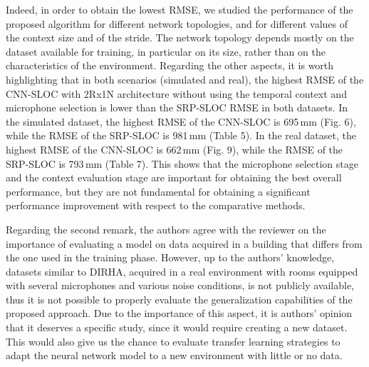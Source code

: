 \documentclass[11pt, technote, letterpaper, oneside, onecolumn]{IEEEtran}
\begin{document}
\begin{enumerate}
 Indeed, in order to obtain the lowest RMSE, we studied the performance of the proposed algorithm for different network topologies, and for different values of the context size and of the stride. The network topology depends mostly on the dataset available for training, in particular on its size, rather than on the characteristics of the environment. Regarding the other aspects, it is worth highlighting that in both scenarios (simulated and real), the highest RMSE of the CNN-SLOC with 2Rx1N architecture without using the temporal context and microphone selection is lower than the SRP-SLOC RMSE in both datasets. In the simulated dataset, the highest RMSE of the CNN-SLOC is 695\,mm (Fig. 6), while the RMSE of the SRP-SLOC is 981\,mm (Table 5). In the real dataset, the highest RMSE of the CNN-SLOC is 662\,mm (Fig. 9), while the RMSE of the SRP-SLOC is 793\,mm (Table 7). This shows that the microphone selection stage and the context evaluation stage are important for obtaining the best overall performance, but they are not fundamental for obtaining a significant performance improvement with respect to the comparative methods.
 
 


Regarding the second remark, the authors agree with the reviewer on the importance of evaluating a model on data acquired in a building that differs from the one used in the training phase. However, up to the authors' knowledge, datasets similar to DIRHA, acquired in a real environment with rooms equipped with several microphones and various noise conditions, is not publicly available, thus it is not possible to properly evaluate the generalization capabilities of the proposed approach. Due to the importance of this aspect, it is authors' opinion that it deserves a specific study, since it would require creating a new dataset. This would also give us the chance to evaluate transfer learning strategies to adapt the neural network model to a new environment with little or no data. 


\end{enumerate}
\end{document}
